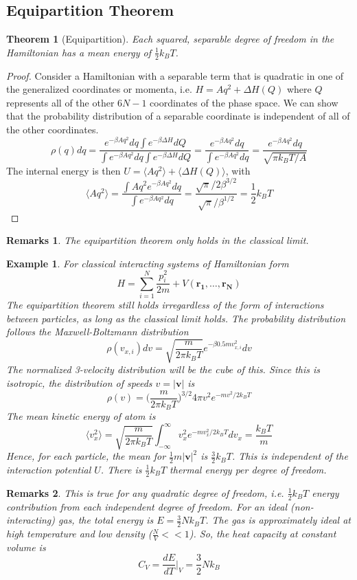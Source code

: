 \documentclass[a4paper]{article}
\newtheorem{eg}{Example}[section]
\newtheorem{remarks}{Remarks}[section]
\theoremstyle{new}
\newtheorem{thm}{Theorem}[section]
\begin{document}
\subsection{Equipartition Theorem}
\begin{thm}[Equipartition]
Each squared, separable degree of freedom in the Hamiltonian has a mean energy of $\frac{1}{2}k_BT$.
\end{thm}
\begin{proof}
Consider a Hamiltonian with a separable term that is quadratic in one of the generalized coordinates or momenta, i.e. $H=Aq^2+\Delta H(Q)$ where $Q$ represents all of the other $6N-1$ coordinates of the phase space. We can show that the probability distribution of a separable coordinate is independent of all of the other coordinates.
$$\rho(q)dq=\frac{e^{-\beta Aq^2}dq\int e^{-\beta\Delta H}dQ}{\int e^{-\beta Aq^2}dq\int e^{-\beta\Delta H}dQ}=\frac{e^{-\beta Aq^2}dq}{\int e^{-\beta Aq^2}dq}=\frac{e^{-\beta Aq^2}dq}{\sqrt{\pi k_BT/A}}$$
The internal energy is then $U=\langle Aq^2\rangle+\langle\Delta H(Q)\rangle$, with
\begin{equation}
\langle Aq^2\rangle=\frac{\int Aq^2e^{-\beta Aq^2}dq}{\int e^{-\beta Aq^2}dq}=\frac{\sqrt{\pi}/2\beta^{3/2}}{\sqrt{\pi}/\beta^{1/2}}=\frac{1}{2}k_BT\label{equipartition}
\end{equation}
\end{proof}
\begin{remarks}
The equipartition theorem only holds in the classical limit.
\end{remarks}
\begin{eg}
For classical interacting systems of Hamiltonian form
$$H=\sum_{i=1}^N\frac{p_i^2}{2m}+V(\mathbf{r_1},\dots,\mathbf{r_N})$$
The equipartition theorem still holds irregardless of the form of interactions between particles, as long as the classical limit holds. The probability distribution follows the Maxwell-Boltzmann distribution
$$\rho(v_{x,i})dv=\sqrt{\frac{m}{2\pi k_BT}}e^{-\beta0.5 mv_{x,i}^2}dv$$
The normalized 3-velocity distribution will be the cube of this. Since this is isotropic, the distribution of speeds $v=|\mathbf{v}|$ is
$$\rho(v)=\bigg(\frac{m}{2\pi k_BT}\bigg)^{3/2}4\pi v^2e^{-mv^2/2k_BT}$$
The mean kinetic energy of atom is
$$\langle v_x^2\rangle=\sqrt{\frac{m}{2\pi k_BT}}\int_{-\infty}^\infty v_x^2e^{-mv_x^2/2k_BT}dv_x=\frac{k_BT}{m}$$
Hence, for each particle, the mean for $\frac{1}{2}m|\mathbf{v}|^2$ is $\frac{3}{2}k_BT$. This is independent of the interaction potential $U$. There is $\frac{1}{2}k_BT$ thermal energy per degree of freedom.
\end{eg}
\begin{remarks}
This is true for any quadratic degree of freedom, i.e. $\frac{1}{2}k_BT$ energy contribution from each independent degree of freedom. For an ideal (non-interacting) gas, the total energy is $E=\frac{3}{2}Nk_BT$. The gas is approximately ideal at high temperature and low density ($\frac{N}{V}<<1$). So, the heat capacity at constant volume is
$$C_V=\frac{dE}{dT}\bigg|_V=\frac{3}{2}Nk_B$$
\end{remarks}
\newpage
\end{document}
